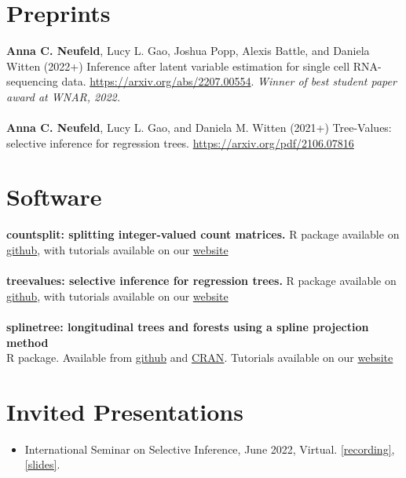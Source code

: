 \documentclass[margin, 10pt]{res} %
\begin{document}
\begin{resume}
{\section{Preprints} 
\textbf{Anna C. Neufeld}, Lucy L. Gao, Joshua Popp, Alexis Battle, and Daniela Witten (2022+) Inference after latent variable estimation for single cell RNA-sequencing data. \href{https://arxiv.org/abs/2207.00554}{https://arxiv.org/abs/2207.00554}. \emph{Winner of best student paper award at WNAR, 2022.} \\
\\
\textbf{Anna C. Neufeld}, Lucy L. Gao, and Daniela M. Witten (2021+) Tree-Values: selective inference for regression trees. \href{https://arxiv.org/pdf/2106.07816}{https://arxiv.org/pdf/2106.07816}




\section{Software} 
\textbf{countsplit: splitting integer-valued count matrices.} R package available on \href{https://github.com/anna-neufeld/countsplit}{github}, with tutorials available on our \href{https://github.com/anna-neufeld/countsplit}{website} \\
\\
\textbf{treevalues: selective inference for regression trees.} R package available on \href{https://github.com/anna-neufeld/treevalues}{github}, with tutorials available on our \href{https://github.com/anna-neufeld/treevalues}{website} \\
\\
\textbf{splinetree: longitudinal trees and forests using a spline projection method} \\
R package. Available from \href{https://github.com/anna-neufeld/splinetree}{github} and \href{https://cran.r-project.org/web/packages/splinetree/index.html}{CRAN}. Tutorials available on our \href{https://github.com/anna-neufeld/splinetree}{website}


\section{Invited Presentations} 
\begin{itemize}
\item International Seminar on Selective Inference, June 2022, Virtual.
\href{https://drive.google.com/file/d/1U4s7xiuz5yOCeDL2hjfIPZPbD7EsmINb/view}{[recording]}, \href{https://drive.google.com/file/d/1KPX8TkT85jHYalxhieyy65PAj18PRbFF/view}{[slides]}.
\end{itemize}

}
\end{resume}
\end{document}
